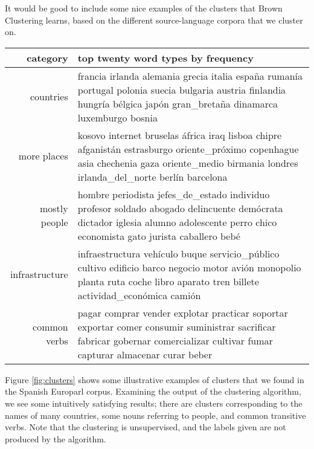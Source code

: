 It would be good to include some nice examples of the clusters that Brown
Clustering learns, based on the different source-language corpora that we
cluster on.


\begin{figure*}[t!]
  \begin{tabular}{|r|p{10cm}|}
    \hline
    category  & top twenty word types by frequency \\
    \hline
    countries & francia irlanda alemania grecia italia españa rumanía portugal polonia suecia bulgaria austria finlandia hungría bélgica japón gran\_bretaña dinamarca luxemburgo bosnia \\
    \hline
    more places & kosovo internet bruselas áfrica iraq lisboa chipre afganistán estrasburgo oriente\_próximo copenhague asia chechenia gaza oriente\_medio birmania londres irlanda\_del\_norte berlín barcelona \\
    \hline
    mostly people & hombre periodista jefes\_de\_estado individuo profesor soldado abogado delincuente demócrata dictador iglesia alumno adolescente perro chico economista gato jurista caballero bebé \\
    \hline
    infrastructure & infraestructura vehículo buque servicio\_público cultivo edificio barco negocio motor avión monopolio planta ruta coche libro aparato tren billete actividad\_económica camión \\
    \hline
    common verbs & pagar comprar vender explotar practicar soportar exportar comer consumir suministrar sacrificar fabricar gobernar comercializar cultivar fumar capturar almacenar curar beber \\
    \hline
  \end{tabular}
\caption{Some illustrative clusters found by the Brown clustering algorithm on
the Spanish Europarl data. These are five out of $C=1000$ clusters, and
were picked and labeled by hand. The words listed are the
top twenty terms from that cluster, by frequency.}
\label{fig:clusters}
\end{figure*}

Figure \ref{fig:clusters} shows some illustrative examples of clusters that
we found in the Spanish Europarl corpus.  Examining the output of the
clustering algorithm, we see some intuitively satisfying results; there are
clusters corresponding to the names of many countries, some nouns referring to
people, and common transitive verbs. Note that the clustering is unsupervised,
and the labels given are not produced by the algorithm.


